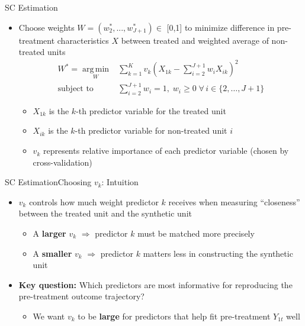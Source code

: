 \documentclass[hyperref={pdfpagelabels=false}]{beamer}
\DeclareMathOperator*{\argmin}{arg\,min}
\begin{document}
\begin{frame}{SC Estimation}
\begin{itemize}
	\item Choose weights $W=(w^{*}_{2},...,w^{*}_{J+1})$$\in$ [0,1] to minimize difference in pre-treatment characteristics $X$ between treated and weighted average of non-treated units
	\vspace{0.2cm}
	\begin{equation*}
		\begin{aligned}
			W^* = \argmin\limits_{W} & \sum_{k=1}^{K} v_k\left(X_{1k} - \sum_{i=2}^{J+1} w_i X_{ik}\right)^2 \\
			\text{subject to } & \sum_{i=2}^{J+1} w_i = 1, \; w_i \geq 0 \;\forall\, i \in \{2,\ldots,J+1\}
		\end{aligned}
\end{equation*}

\begin{itemize}
	\item $X_{1k}$ is the $k$-th predictor variable for the treated unit
				\vspace{0.2cm}
		\item $X_{ik}$ is the $k$-th predictor variable for non-treated unit $i$
					\vspace{0.2cm}
			\item $v_k$ represents relative importance of each predictor variable (chosen by cross-validation)
\end{itemize}
\end{itemize}
\end{frame}


\begin{frame}{SC Estimation}{Choosing $v_k$: Intuition}
\begin{itemize}
	\item $v_k$ controls how much weight predictor $k$ receives when measuring ``closeness'' between the treated unit and the synthetic unit
	\vspace{0.2cm}
	\begin{itemize}
		\item A \textbf{larger} $v_k$ $\Rightarrow$ predictor $k$ must be matched more precisely
		\vspace{0.2cm}
		\item A \textbf{smaller} $v_k$ $\Rightarrow$ predictor $k$ matters less in constructing the synthetic unit
	\end{itemize}
	\vspace{0.2cm}
	\item \textbf{Key question:} Which predictors are most informative for reproducing the pre-treatment outcome trajectory?
	\vspace{0.2cm}
	\begin{itemize}
		\item We want $v_k$ to be \textbf{large} for predictors that help fit pre-treatment $Y_{1t}$ well
	\end{itemize}
\end{itemize}
\end{frame}
\end{document}
